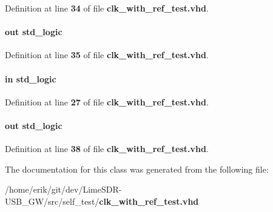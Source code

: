 Definition at line {\bf 34} of file {\bf clk\+\_\+with\+\_\+ref\+\_\+test.\+vhd}.

\paragraph[{test\+\_\+complete}]{ {\bfseries \textcolor{keywordflow}{out}\textcolor{vhdlchar}{ }} {\bfseries \textcolor{comment}{std\+\_\+logic}\textcolor{vhdlchar}{ }} \hspace{0.3cm}{\ttfamily [Port]}}\label{classclk__with__ref__test_acf1984f76c7a6676510f3d7774e724cd}


Definition at line {\bf 35} of file {\bf clk\+\_\+with\+\_\+ref\+\_\+test.\+vhd}.

\paragraph[{test\+\_\+en}]{ {\bfseries \textcolor{keywordflow}{in}\textcolor{vhdlchar}{ }} {\bfseries \textcolor{comment}{std\+\_\+logic}\textcolor{vhdlchar}{ }} \hspace{0.3cm}{\ttfamily [Port]}}\label{classclk__with__ref__test_a4b3cbe4c35cbc762687ca6f1f8d45f6f}


Definition at line {\bf 27} of file {\bf clk\+\_\+with\+\_\+ref\+\_\+test.\+vhd}.

\paragraph[{test\+\_\+pass\+\_\+fail}]{ {\bfseries \textcolor{keywordflow}{out}\textcolor{vhdlchar}{ }} {\bfseries \textcolor{comment}{std\+\_\+logic}\textcolor{vhdlchar}{ }} \hspace{0.3cm}{\ttfamily [Port]}}\label{classclk__with__ref__test_a1bba60b74f318713ff472903c86e248c}


Definition at line {\bf 38} of file {\bf clk\+\_\+with\+\_\+ref\+\_\+test.\+vhd}.



The documentation for this class was generated from the following file\+:\begin{DoxyCompactItemize}
\item 
/home/erik/git/dev/\+Lime\+S\+D\+R-\/\+U\+S\+B\+\_\+\+G\+W/src/self\+\_\+test/{\bf clk\+\_\+with\+\_\+ref\+\_\+test.\+vhd}\end{DoxyCompactItemize}
